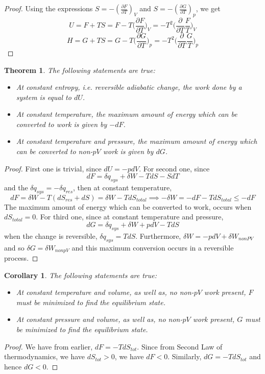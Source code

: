 \documentclass[a4paper]{article}
\newtheorem{thm}{Theorem}[section]
\newtheorem{cor}{Corollary}[section]
\theoremstyle{new}
\begin{document}
\begin{proof}
Using the expressions $S=-(\frac{\partial F}{\partial T})_V$ and $S=-(\frac{\partial G}{\partial T})_p$, we get
$$U=F+TS=F-T\bigg(\frac{\partial F}{\partial T}\bigg)_V=-T^2\bigg(\frac{\partial}{\partial T}\frac{F}{T}\bigg)_V$$
$$H=G+TS=G-T\bigg(\frac{\partial G}{\partial T}\bigg)_p=-T^2\bigg(\frac{\partial}{\partial T}\frac{G}{T}\bigg)_p$$
\end{proof}
\begin{thm}
The following statements are true:
\begin{itemize}
    \item At constant entropy, i.e. reversible adiabatic change, the work done by a system is equal to $dU$.
    \item At constant temperature, the maximum amount of energy which can be converted to work is given by $-dF$.
    \item At constant temperature and pressure, the maximum amount of energy which can be converted to non-$pV$ work is given by $dG$.
\end{itemize}
\end{thm}
\begin{proof}
First one is trivial, since $dU=-pdV$. For second one, since
$$dF=\delta q_{sys}+\delta W-TdS-SdT$$
and the $\delta q_{sys}=-\delta q_{res}$, then at constant temperature,
$$dF=\delta W-T(dS_{res}+dS)=\delta W-TdS_{total}\implies -\delta W=-dF-TdS_{total}\leq -dF$$
The maximum amount of energy which can be converted to work, occurs when $dS_{total}=0$. For third one, since at constant temperature and pressure,
$$dG=\delta q_{sys}+\delta W+pdV−TdS$$
when the change is reversible, $\delta q_{sys}=TdS$. Furthermore, $\delta W=-pdV+\delta W_{nonPV}$ and so $\delta G=\delta W_{nonpV}$ and this maximum conversion occurs in a reversible process.
\end{proof}
\begin{cor}
The following statements are true:
\begin{itemize}
    \item At constant temperature and volume, as well as, no non-$pV$ work present, $F$ must be minimized to find the equilibrium state.
    \item At constant pressure and volume, as well as, no non-$pV$ work present, $G$ must be minimized to find the equilibrium state.
\end{itemize}
\end{cor}
\begin{proof}
We have from earlier, $dF=-TdS_{tot}$. Since from Second Law of thermodynamics, we have $dS_{tot}>0$, we have $dF<0$. Similarly, $dG=-TdS_{tot}$ and hence $dG<0$.
\end{proof}
\end{document}
